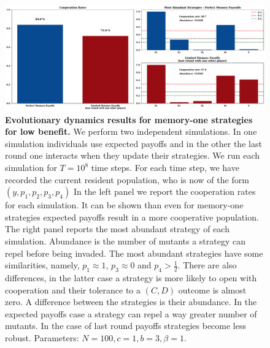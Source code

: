 \documentclass[11pt]{article}
\theoremstyle{plainCl1}
\theoremstyle{plainCl2}
\begin{document}
\begin{figure}[!htbp]
  \centering 
  \includegraphics[width=\textwidth]{static/memory_one_results_low_benefit.pdf}
  \caption{\textbf{Evolutionary dynamics results for memory-one strategies for low benefit.}
  We perform two independent simulations. In one simulation individuals use
  expected payoffs and in the other the last round one interacts when they
  update their strategies. We run each simulation for \(T = 10^8\) time steps.
  For each time step, we have recorded the current resident population, who is
  now of the form  \((y, p_1, p_2, p_3, p_4)\) In the left panel we report the
  cooperation rates for each simulation. It can be shown than even for
  memory-one strategies expected payoffs result in a more cooperative
  population. The right panel reports the most abundant strategy of each
  simulation. Abundance is the number of mutants a strategy can repel before
  being invaded. The most abundant strategies have some similarities,
  namely, \(p_1 \approx 1\), \(p_3 \approx 0\) and \(p_4 > \frac{1}{2}\). There are also differences, in the latter
  case a strategy is more likely to open with cooperation and their tolerance to
  a \((C, D)\) outcome is almost zero. A difference between the strategies is their
  abundance. In the expected payoffs case a strategy can repel a way greater
  number of mutants. In the case of last round payoffs strategies become less
  robust. Parameters: \(N =100, c=1, b=3, \beta=1\).}\label{fig:memory_one_low_benefit}
\end{figure}
\end{document}

